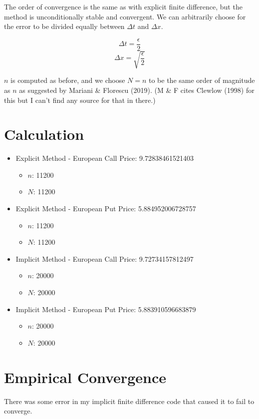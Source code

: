 \documentclass[11pt]{article}
\providecommand{\tightlist}{%
      \setlength{\itemsep}{0pt}\setlength{\parskip}{0pt}}
\begin{document}
    The order of convergence is the same as with explicit finite difference,
but the method is unconditionally stable and convergent. We can
arbitrarily choose for the error to be divided equally between
\(\Delta t\) and \(\Delta x\).

\[\Delta t = \frac{\epsilon}{2}\]
\[\Delta x = \sqrt{\frac{\epsilon}{2}}\]

\(n\) is computed as before, and we choose \(N = n\) to be the same
order of magnitude as \(n\) as suggested by Mariani \& Florescu (2019).
(M \& F cites Clewlow (1998) for this but I can't find any source for
that in there.)

    \section{Calculation}\label{calculation}

    \begin{itemize}
\tightlist
\item
  Explicit Method - European Call Price: 9.72838461521403

  \begin{itemize}
  \tightlist
  \item
    \(n\): 11200
  \item
    \(N\): 11200
  \end{itemize}
\item
  Explicit Method - European Put Price: 5.884952006728757

  \begin{itemize}
  \tightlist
  \item
    \(n\): 11200
  \item
    \(N\): 11200
  \end{itemize}
\item
  Implicit Method - European Call Price: 9.72734157812497

  \begin{itemize}
  \tightlist
  \item
    \(n\): 20000
  \item
    \(N\): 20000
  \end{itemize}
\item
  Implicit Method - European Put Price: 5.883910596683879

  \begin{itemize}
  \tightlist
  \item
    \(n\): 20000
  \item
    \(N\): 20000
  \end{itemize}
\end{itemize}

    \section{Empirical Convergence}\label{empirical-convergence}

    There was some error in my implicit finite difference code that caused
it to fail to converge.


    
    
    
\end{document}
